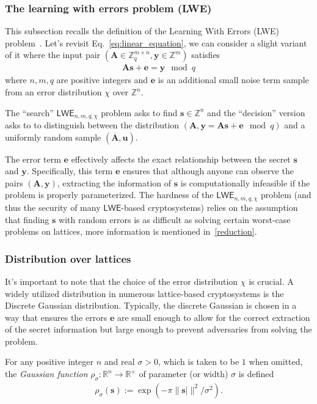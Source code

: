 \documentclass[cryptography,review,submit,pdftex,moreauthors,amsmath,amssymb,aps,strict]{Definitions/mdpi}
\begin{document}
\subsubsection{The learning with errors problem (LWE)}
This subsection recalls the definition of the Learning With Errors (LWE) problem~\cite{Pei16}. Let's revisit Eq.~\eqref{eq:linear_equation}, we can consider a slight variant of it where the input pair $(\mathbf{A}\in \mathbb{Z}^{m\times n}_q, \mathbf{y} \in \mathbb{Z}^m)$ satisfies
\begin{align}
    \mathbf{A}\mathbf{s} + \mathbf{e}= \mathbf{y}\mod q \label{eq:lwe}
\end{align}
where $n, m, q$ are positive integers and $\mathbf{e}$ is an additional small noise term sample from an error distribution $\chi$ over $\mathbb{Z}^n$. 

The ``search'' $\mathsf{LWE}_{n,m,q,\chi}$ problem asks to find $\mathbf{s}\in\mathbb{Z}^n$ and the ``decision'' version asks to to distinguish between the distribution $ (\mathbf{A},\mathbf{y}=\mathbf{A}\mathbf{s}+\mathbf{e} \mod q)$ and a uniformly random sample $(\overline{\mathbf{A}},\mathbf{u})$.

The error term $\mathbf{e}$ effectively affects the exact relationship between the secret $\mathbf{s}$ and $\mathbf{y}$. Specifically, this term $\mathbf{e}$ ensures that although anyone can observe the pairs $(\mathbf{A},\mathbf{y})$, extracting the information of $\mathbf{s}$ is computationally infeasible if the problem is properly parameterized. The hardness of the $\mathsf{LWE}_{n,m,q,\chi}$ problem (and thus the security of many $\mathsf{LWE}$-based cryptosystems) relies on the assumption that finding $\mathbf{s}$ with random errors is as difficult as solving certain worst-case problems on lattices, more information is mentioned in~\ref{reduction}.

\subsubsection{Distribution over lattices}
It's important to note that the choice of the error distribution $\chi$ is crucial. A widely utilized distribution in numerous lattice-based cryptosystems is the Discrete Gaussian distribution. Typically, the discrete Gaussian is chosen in a way that ensures the errors $\mathbf{e}$ are small enough to allow for the correct extraction of the secret information but large enough to prevent adversaries from solving the problem.


For any positive integer $n$ and real $\sigma>0$, which is taken to be $1$ when omitted, the \textit{Gaussian function} $\rho_{\sigma}:\mathbb{R}^n\to \mathbb{R}^+$ of parameter (or width) $\sigma$ is defined 
\begin{align}
    \rho_{\sigma}(\mathbf{s}):=\exp(-\pi\|\mathbf{s}|\|^2/\sigma^2).
\end{align}
\end{document}
